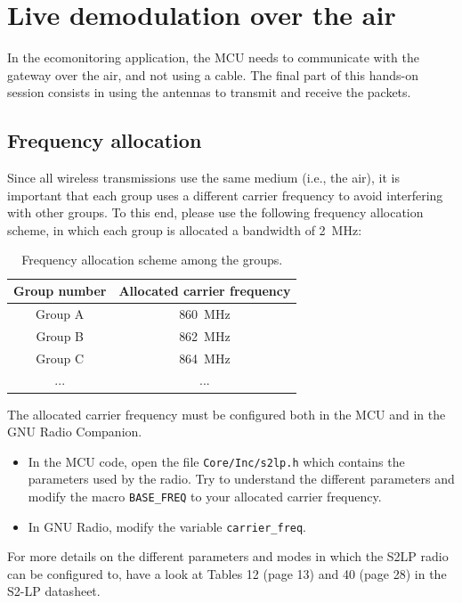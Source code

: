\section{Live demodulation over the air}

In the ecomonitoring application, the MCU needs to communicate with the gateway over the air, and not using a cable.
The final part of this hands-on session consists in using the antennas to transmit and receive the packets.

\subsection{Frequency allocation}

Since all wireless transmissions use the same medium (i.e., the air), it is important that each group uses a different carrier frequency to avoid interfering with other groups.
To this end, please use the following frequency allocation scheme, in which each group is allocated a bandwidth of \SI{2}{\mega\hertz}:
\begin{table}[h]
    \centering
    \begin{tabular}{c|c}
        Group number & Allocated carrier frequency\\
        \hline
        Group A & \SI{860}{\mega\hertz}\\
         Group B & \SI{862}{\mega\hertz}\\
         Group C & \SI{864}{\mega\hertz}\\
         ... & ...
    \end{tabular}
    \caption{Frequency allocation scheme among the groups.}
    \label{tab:freq_alloc}
\end{table}

The allocated carrier frequency must be configured both in the MCU and in the GNU Radio Companion.
\begin{itemize}
    \item In the MCU code, open the file \texttt{Core/Inc/s2lp.h} which contains the parameters used by the radio.
    Try to understand the different parameters and modify the macro \texttt{BASE\_FREQ} to your allocated carrier frequency.
    \item In GNU Radio, modify the variable \texttt{carrier\_freq}.
\end{itemize}
For more details on the different parameters and modes in which the S2LP radio can be configured to, have a look at Tables 12 (page 13) and 40 (page 28) in the S2-LP datasheet.


